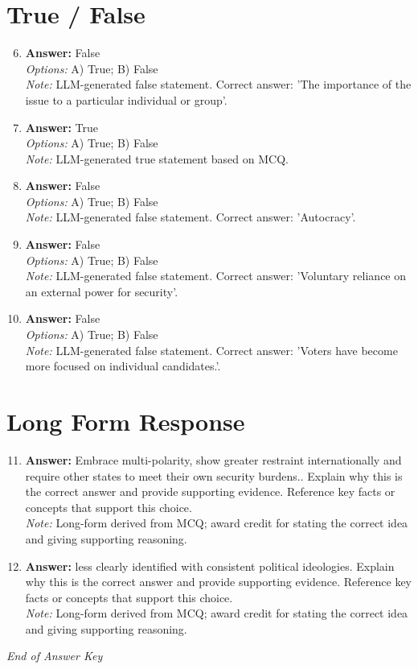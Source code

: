 \documentclass[12pt]{article}
\begin{document}
\section*{True / False}
\begin{enumerate}[label=\arabic*.]
\setcounter{enumi}{5}
\item \textbf{Answer:} False
\\ \textit{Options:} A) True; B) False
\\ \textit{Note:} LLM-generated false statement. Correct answer: 'The importance of the issue to a particular individual or group'.
\item \textbf{Answer:} True
\\ \textit{Options:} A) True; B) False
\\ \textit{Note:} LLM-generated true statement based on MCQ.
\item \textbf{Answer:} False
\\ \textit{Options:} A) True; B) False
\\ \textit{Note:} LLM-generated false statement. Correct answer: 'Autocracy'.
\item \textbf{Answer:} False
\\ \textit{Options:} A) True; B) False
\\ \textit{Note:} LLM-generated false statement. Correct answer: 'Voluntary reliance on an external power for security'.
\item \textbf{Answer:} False
\\ \textit{Options:} A) True; B) False
\\ \textit{Note:} LLM-generated false statement. Correct answer: 'Voters have become more focused on individual candidates.'.
\end{enumerate}

\section*{Long Form Response}
\begin{enumerate}[label=\arabic*.]
\setcounter{enumi}{10}
\item \textbf{Answer:} Embrace multi-polarity, show greater restraint internationally and require other states to meet their own security burdens.. Explain why this is the correct answer and provide supporting evidence. Reference key facts or concepts that support this choice.
\\ \textit{Note:} Long-form derived from MCQ; award credit for stating the correct idea and giving supporting reasoning.
\item \textbf{Answer:} less clearly identified with consistent political ideologies. Explain why this is the correct answer and provide supporting evidence. Reference key facts or concepts that support this choice.
\\ \textit{Note:} Long-form derived from MCQ; award credit for stating the correct idea and giving supporting reasoning.
\end{enumerate}

\vfill
\noindent\textit{End of Answer Key}
\end{document}
